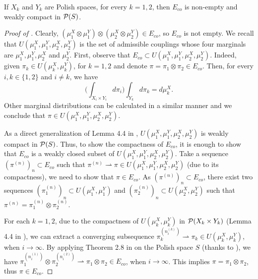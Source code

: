 \begin{lemma} \label{lemma:compact_subset}
  If $X_k$ and $Y_k$ are Polish spaces, for every $k = 1, 2$,
  then $E_{co}$ is non-empty and weakly compact in $\mathcal P(S)$.
\end{lemma}
\begin{proof}[Proof of ]
  Clearly, $(\mu_1^X \otimes \mu_1^Y) \otimes (\mu_2^X \otimes \mu_2^Y) \in E_{co}$,
  so $E_{co}$ is not empty.
  We recall that $U(\mu_1^X, \mu_1^Y, \mu_2^X, \mu_2^Y)$ is the set of admissible couplings
  whose four marginals are $\mu^X_1, \mu^Y_1, \mu^X_2$ and $\mu^Y_2$. First,
  observe that $E_{co} \subset U(\mu_1^X, \mu_1^Y, \mu_2^X, \mu_2^Y)$.
  Indeed, given $\pi_k \in U(\mu_k^X, \mu_k^Y)$, for $k = 1,2$ and denote
  $\pi = \pi_1 \otimes \pi_2 \in E_{co}$. Then, for every $i, k \in \{ 1, 2 \}$ and $i \neq k$,
  we have
  \begin{equation}
      \bigg(\int_{X_{i} \times Y_{i}} d\pi_i \bigg) \int_{Y_k}  d\pi_k = d\mu_k^X.
  \end{equation}
  Other marginal distributions can be calculated in a similar manner and we conclude that
  $\pi \in U(\mu_1^X, \mu_1^Y, \mu_2^X, \mu_2^Y)$.

  As a direct generalization of Lemma 4.4 in \citep{Villani08},
  $U(\mu_1^X, \mu_1^Y, \mu_2^X, \mu_2^Y)$ is weakly compact in $\mathcal P(S)$. Thus,
  to show the compactness of $E_{co}$, it is enough to show that $E_{co}$
  is a weakly closed subset of $U(\mu_1^X, \mu_1^Y, \mu_2^X, \mu_2^Y)$.
  Take a sequence $(\pi^{(n)})_n \subset E_{co}$
  such that $\pi^{(n)} \rightharpoonup \pi \in U(\mu_1^X, \mu_1^Y, \mu_2^X, \mu_2^Y)$
  (due to its compactness), we need to show that $\pi \in E_{co}$.
  As $(\pi^{(n)})_n \subset E_{co}$, there exist two sequences
  $(\pi_1^{(n)})_n \subset U(\mu_1^X, \mu_1^Y)$ and $(\pi_2^{(n)})_n \subset U(\mu_2^X, \mu_2^Y)$
  such that $\pi^{(n)} = \pi_1^{(n)} \otimes \pi_2^{(n)}$.

  For each $k = 1, 2$, due to the compactness of $U(\mu_k^X, \mu_k^Y)$ in $\mathcal P(X_k \times Y_k)$
  (Lemma 4.4 in \citep{Villani08}), we can extract a converging subsequence
  $\pi^{(n_i^{(k)})}_k \rightharpoonup \pi_k \in U(\mu_k^X, \mu_k^Y)$, when $i \to \infty$.
  By applying Theorem 2.8 in \citep{Billingsley99} on the Polish space $S$
  (thanks to ), we have
  $\pi^{(n_i^{(1)})}_1 \otimes \pi^{(n_i^{(2)})}_2 \rightharpoonup \pi_1 \otimes \pi_2 \in E_{co}$,
  when $i \to \infty$. This implies $\pi = \pi_1 \otimes \pi_2$, thus $\pi \in E_{co}$.
\end{proof}
